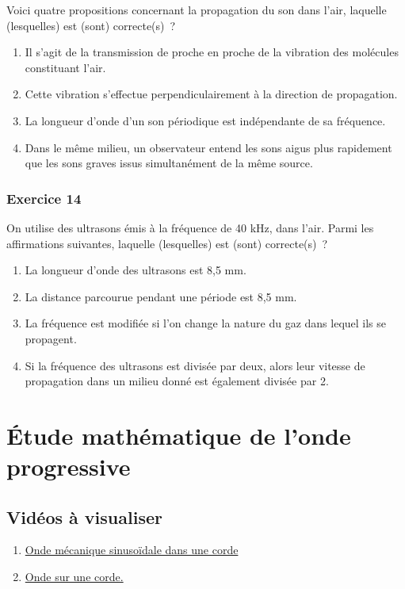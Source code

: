 Voici quatre propositions concernant la propagation du son
  dans l'air, laquelle (lesquelles) est (sont) correcte(s)~?

\begin{enumerate}
\item  Il s'agit de la transmission de proche en proche de la vibration des
  molécules constituant l'air.
\item  Cette vibration s'effectue perpendiculairement à la direction de
  propagation.
\item  La longueur d'onde d'un son périodique est indépendante de sa
  fréquence.
\item  Dans le même milieu, un observateur entend les sons aigus plus
  rapidement que les sons graves issus simultanément de la même source.
\end{enumerate}

\subsubsection*{Exercice 14}

On utilise des ultrasons émis à la fréquence de 40 \si{kHz}, dans
  l'air. Parmi les affirmations suivantes, laquelle (lesquelles) est
  (sont) correcte(s)~?
\begin{enumerate}
\item  La longueur d'onde des ultrasons est 8,5 \si{mm}.
\item
  La distance parcourue pendant une période est 8,5 \si{mm}.
\item  La fréquence est modifiée si l'on change la nature du gaz dans lequel
  ils se propagent.
\item  Si la fréquence des ultrasons est divisée par deux, alors leur vitesse
  de propagation dans un milieu donné est également divisée par 2.
\end{enumerate}


\section{Étude mathématique de l'onde progressive}

\subsection{Vidéos à visualiser}
\begin{enumerate}
 \item \href{https://youtu.be/9Hs9jeuDzwg}{Onde mécanique sinusoïdale dans une corde }
 \item \href{https://youtu.be/N654RoNHalc}{Onde sur une corde.}
\end{enumerate}

